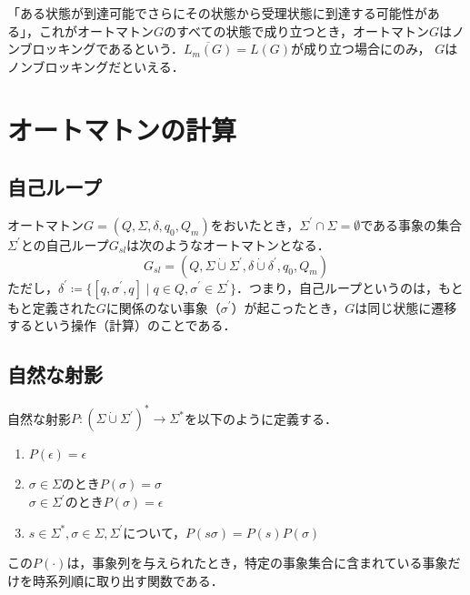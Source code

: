 \documentclass[dvipdfmx]{newthesis}
\begin{document}
「ある状態が到達可能でさらにその状態から受理状態に到達する可能性がある」，これがオートマトン$G$のすべての状態で成り立つとき，オートマトン$G$はノンブロッキングであるという．$\overline{L_m(G)}=L(G)$が成り立つ場合にのみ， $G$はノンブロッキングだといえる．




\section{オートマトンの計算}
\subsection{自己ループ}

オートマトン$G = (Q, \Sigma, \delta, q_0, Q_m)$をおいたとき，$\Sigma^\prime \cap \Sigma=\emptyset$である事象の集合$\Sigma^\prime$との自己ループ$G_{sl}$は次のようなオートマトンとなる．
\begin{equation}
    G_{sl}=(Q,\Sigma\dot{\cup}\Sigma^\prime,\delta\dot{\cup}\delta^\prime,q_0,Q_m)
\end{equation}
ただし，$\delta^\prime\coloneqq\{[q,\sigma^\prime,q]\mid q\in Q,\sigma^\prime\in\Sigma^\prime\}$．つまり，自己ループというのは，もともと定義された$G$に関係のない事象（$\sigma^\prime$）が起こったとき，$G$は同じ状態に遷移するという操作（計算）のことである．

\subsection{自然な射影}

自然な射影$P\colon{(\Sigma\dot{\cup}\Sigma^\prime)}^\ast\rightarrow\Sigma^\ast$を以下のように定義する．
\begin{enumerate}
    \renewcommand{\theenumi}{(\roman{enumi})}
    
    \item $P(\epsilon) = \epsilon$
    \item $\sigma\in\Sigma$のとき$P(\sigma)=\sigma$\\
    $\sigma\in\Sigma^\prime$のとき$P(\sigma)=\epsilon$
    \item $s\in\Sigma^\ast,\sigma\in\Sigma,\Sigma^\prime$について，$P(s\sigma) = P(s)P(\sigma) $
\end{enumerate}

この$P(\cdot)$は，事象列を与えられたとき，特定の事象集合に含まれている事象だけを時系列順に取り出す関数である．
\end{document}
